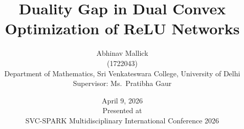 \newcommand{\Xmat}{\mathbf{X}}              %
\newcommand{\yvec}{\mathbf{y}}              %
\newcommand{\uvec}{\mathbf{u}}              %

\newcommand{\relu}[1]{(#1)_+}              %
\newcommand{\alphaj}{\alpha_j}             %
\newcommand{\betareg}{\beta}               %

\newcommand{\Pstar}{P^*}                   %
\newcommand{\Dstar}{D^*}                   %
\newcommand{\gap}{\text{gap}}              %
\newcommand{\mstar}{m^*}                   %

\newcommand{\Di}{D_i}                      %
\newcommand{\PP}{P}                        %
\newcommand{\rrank}{r}                     %

\newcommand{\ptildestar}{\tilde{p}^*}      %
\newcommand{\CC}{C}                        %

\newcommand{\nucnorm}[1]{\|#1\|_{*}}       %
\newcommand{\schattennorm}[1]{\|#1\|_{S_{2/L}}}  %

\title[Convex ReLU Networks]{%
  Duality Gap in Dual Convex Optimization of ReLU Networks\\[4pt]%
}
\author[Abhinav Mallick]{Abhinav Mallick\\[2pt]\normalsize (1722043)\\[8pt]
\small Department of Mathematics, Sri Venkateswara College, University of Delhi\\[6pt]
Supervisor: Ms.\ Pratibha Gaur}
\institute[]{}
\date{April 9, 2026\\[4pt]{\normalsize Presented at}\\[2pt]{\normalsize SVC-SPARK Multidisciplinary International Conference 2026}}


